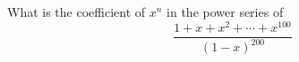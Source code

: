 
What is the coefficient of $x^n$ in the power series of
\[
\frac{1 + x + x^2 + \cdots + x^{100}}{(1 - x)^{200}}
\]
